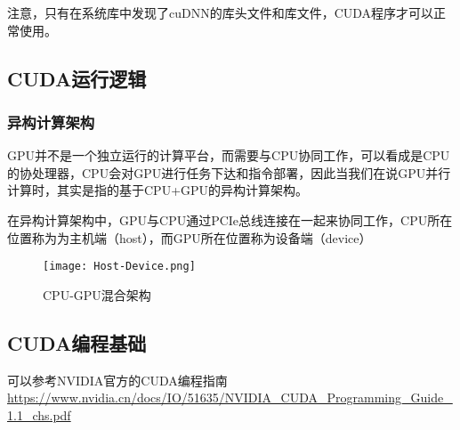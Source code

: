 注意，只有在系统库中发现了cuDNN的库头文件和库文件，CUDA程序才可以正常使用。

\subsection{CUDA运行逻辑}

\subsubsection{异构计算架构}

GPU并不是一个独立运行的计算平台，而需要与CPU协同工作，可以看成是CPU的协处理器，CPU会对GPU进行任务下达和指令部署，因此当我们在说GPU并行计算时，其实是指的基于CPU+GPU的异构计算架构。

在异构计算架构中，GPU与CPU通过PCIe总线连接在一起来协同工作，CPU所在位置称为为主机端（host），而GPU所在位置称为设备端（device）

\begin{figure}[H]
    \centering
    \texttt{[image: Host-Device.png]}
    \caption{CPU-GPU混合架构} %
    \label{fig:CPU-GPU} %
\end{figure}

















\subsection{CUDA编程基础}
可以参考NVIDIA官方的CUDA编程指南\url{https://www.nvidia.cn/docs/IO/51635/NVIDIA_CUDA_Programming_Guide_1.1_chs.pdf}


